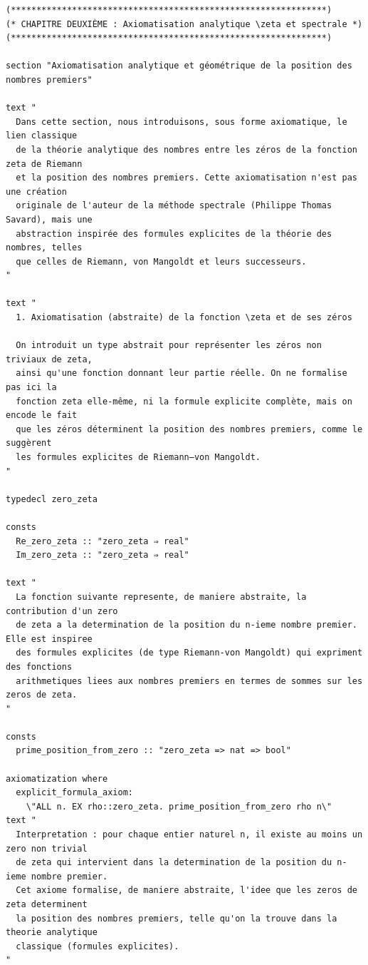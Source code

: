 \documentclass[a4paper,11pt]{article}
\begin{document}
\begin{holcode}[title={\textcolor{white}{Fichier : methode\_spectral.thy -- Partie 6/6 (FIN)}}]
\begin{lstlisting}
(**************************************************************)
(* CHAPITRE DEUXIÈME : Axiomatisation analytique \zeta et spectrale *)
(**************************************************************)

section "Axiomatisation analytique et géométrique de la position des nombres premiers"

text "
  Dans cette section, nous introduisons, sous forme axiomatique, le lien classique
  de la théorie analytique des nombres entre les zéros de la fonction zeta de Riemann
  et la position des nombres premiers. Cette axiomatisation n'est pas une création
  originale de l'auteur de la méthode spectrale (Philippe Thomas Savard), mais une
  abstraction inspirée des formules explicites de la théorie des nombres, telles
  que celles de Riemann, von Mangoldt et leurs successeurs.
"

text "
  1. Axiomatisation (abstraite) de la fonction \zeta et de ses zéros

  On introduit un type abstrait pour représenter les zéros non triviaux de zeta,
  ainsi qu'une fonction donnant leur partie réelle. On ne formalise pas ici la
  fonction zeta elle-même, ni la formule explicite complète, mais on encode le fait
  que les zéros déterminent la position des nombres premiers, comme le suggèrent
  les formules explicites de Riemann–von Mangoldt.
"

typedecl zero_zeta

consts
  Re_zero_zeta :: "zero_zeta ⇒ real"
  Im_zero_zeta :: "zero_zeta ⇒ real"

text "
  La fonction suivante represente, de maniere abstraite, la contribution d'un zero
  de zeta a la determination de la position du n-ieme nombre premier. Elle est inspiree
  des formules explicites (de type Riemann-von Mangoldt) qui expriment des fonctions
  arithmetiques liees aux nombres premiers en termes de sommes sur les zeros de zeta.
"

consts
  prime_position_from_zero :: "zero_zeta => nat => bool"

axiomatization where
  explicit_formula_axiom:
    \"ALL n. EX rho::zero_zeta. prime_position_from_zero rho n\"
text "
  Interpretation : pour chaque entier naturel n, il existe au moins un zero non trivial
  de zeta qui intervient dans la determination de la position du n-ieme nombre premier.
  Cet axiome formalise, de maniere abstraite, l'idee que les zeros de zeta determinent
  la position des nombres premiers, telle qu'on la trouve dans la theorie analytique
  classique (formules explicites).
"


\end{lstlisting}
\end{holcode}
\end{document}
